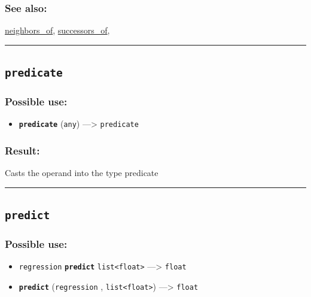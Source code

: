 \documentclass[]{book}
\providecommand{\tightlist}{%
  \setlength{\itemsep}{0pt}\setlength{\parskip}{0pt}}
\theoremstyle{definition}
\theoremstyle{definition}
\theoremstyle{definition}
\theoremstyle{remark}
\begin{document}
\subsubsection{See also:}\label{see-also-168}

\href{operators-n-to-r.html\#neighbors_of}{neighbors\_of},
\href{operators-s-to-z.html\#successors_of}{successors\_of},

\begin{center}\rule{0.5\linewidth}{\linethickness}\end{center}

\subsection{\texorpdfstring{\texttt{predicate}}{predicate}}\label{predicate}

\subsubsection{Possible use:}\label{possible-use-416}

\begin{itemize}
\tightlist
\item
  \textbf{\texttt{predicate}} (\texttt{any}) ---\textgreater{}
  \texttt{predicate}
\end{itemize}

\subsubsection{Result:}\label{result-402}

Casts the operand into the type predicate

\begin{center}\rule{0.5\linewidth}{\linethickness}\end{center}

\subsection{\texorpdfstring{\texttt{predict}}{predict}}\label{predict}

\subsubsection{Possible use:}\label{possible-use-417}

\begin{itemize}
\tightlist
\item
  \texttt{regression} \textbf{\texttt{predict}}
  \texttt{list\textless{}float\textgreater{}} ---\textgreater{}
  \texttt{float}
\item
  \textbf{\texttt{predict}} (\texttt{regression} ,
  \texttt{list\textless{}float\textgreater{}}) ---\textgreater{}
  \texttt{float}
\end{itemize}
\end{document}
